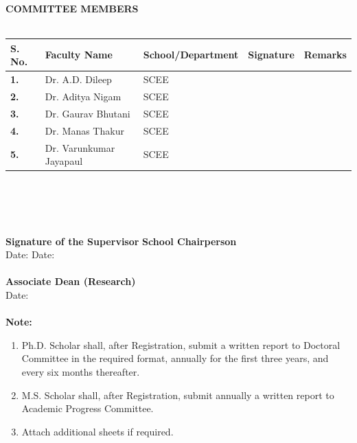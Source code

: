 \documentclass[12 pt, a4paper]{article}
\begin{document}
\noindent \textbf{COMMITTEE MEMBERS}\\\\
\indent
\begin{tabular}{|p{1.25cm}|p{5cm}|p{4cm}|p{3cm}|p{2cm}|}
	\hline\rule{0pt}{15pt} \bf S. No. & \bf Faculty Name & \bf School/Department & \bf Signature & \bf Remarks \\ 
	\hline\rule{0pt}{18pt}\bf 1. & Dr. A.D. Dileep  & SCEE &  &  \\[10pt]
	\hline\rule{0pt}{18pt}\bf 2. & Dr. Aditya Nigam & SCEE &  &  \\ [10pt]
	\hline \rule{0pt}{18pt}\bf3. & Dr. Gaurav Bhutani & SCEE &  &  \\ [10pt] 
	\hline \rule{0pt}{18pt}\bf4. & Dr. Manas Thakur & SCEE &  &  \\ [10pt] 
	\hline \rule{0pt}{18pt}\bf5. & Dr. Varunkumar Jayapaul & SCEE &  &  \\ [10pt]
	\hline 
\end{tabular} \\\\\\\\
\textbf{Signature of the Supervisor} \hspace{7.0cm} \textbf{School Chairperson}\\
Date: \hspace{11.3cm}  Date:\\
\vspace{1cm} \\
\hspace*{6cm}\textbf{Associate Dean (Research)}\\
\hspace*{6cm}Date:\\\\
\textbf{Note:}

\begin{enumerate}[label=(\roman*)]
	\item Ph.D. Scholar shall, after Registration, submit a written report to Doctoral Committee in the required
	format, annually for the first three years, and every six months thereafter.
	\item M.S. Scholar shall, after Registration, submit annually a written report to Academic Progress Committee.
	\item Attach additional sheets if required.
\end{enumerate}
\clearpage


\end{document}
